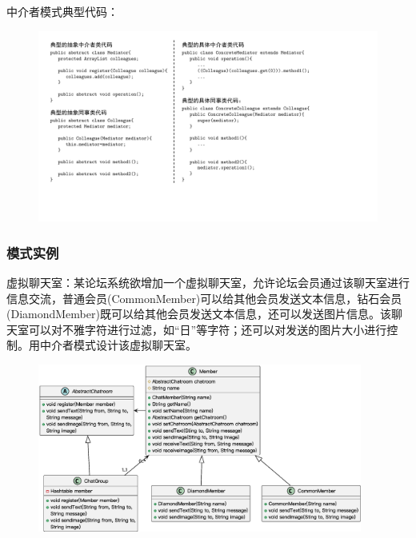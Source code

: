 中介者模式典型代码：
\begin{figure}[H]
    \vspace{-0.5em}
	\centering
	\includegraphics[width=\textwidth]{images/中介者模式典型代码.pdf}
    \vspace{-2em}
\end{figure}

\subsubsection{模式实例}
虚拟聊天室：某论坛系统欲增加一个虚拟聊天室，允许论坛会员通过该聊天室进行信息交流，普通会员(CommonMember)可以给其他会员发送文本信息，钻石会员(DiamondMember)既可以给其他会员发送文本信息，还可以发送图片信息。该聊天室可以对不雅字符进行过滤，如“日”等字符；还可以对发送的图片大小进行控制。用中介者模式设计该虚拟聊天室。
\begin{figure}[H]
    \vspace{-0.5em}
	\centering
	\includegraphics[width=0.95\textwidth]{images/中介者模式实例.eps}
    \vspace{-1em}
\end{figure}

